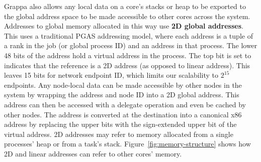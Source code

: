 Grappa also allows any local data on a core's stacks or heap to be
exported to the global address space to be made accessible to other
cores across the system. Addresses to global memory allocated in this
way use \textbf{2D global addresses}.  This uses a traditional PGAS
addressing model, where each address is a tuple of a rank in the job (or
global process ID) and an address in that process. The lower 48 bits of
the address hold a virtual address in the process. The top bit is set to
indicates that the reference is a 2D address (as opposed to linear
address). This leaves 15 bits for network endpoint ID, which limits our
scalability to $2^{15}$ endpoints. Any node-local data can be made
accessible by other nodes in the system by wrapping the address and node
ID into a 2D global address. This address can then be accessed with a
delegate operation and even be cached by other nodes. The
address is converted at the destination into a canonical x86 address by replacing the upper
bits with the sign-extended upper bit of the virtual address. 2D
addresses may refer to memory allocated from a single processes' heap or
from a task's stack. Figure~\ref{fig:memory-structure} shows how 2D and
linear addresses can refer to other cores' memory.


